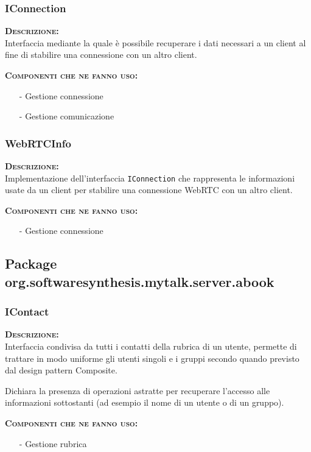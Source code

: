 \subsubsection{IConnection}
\begin{description}
	\item{\scshape\bfseries Descrizione:}\\
Interfaccia mediante la quale è possibile recuperare  i dati necessari a un client al fine di stabilire una connessione con un altro client.
	\item{\scshape\bfseries Componenti che ne fanno uso:}
		\begin{itemize}[noitemsep,nolistsep]
			\item[-] Gestione connessione
			\item[-] Gestione comunicazione
		\end{itemize}
\end{description}

\subsubsection{WebRTCInfo}
\begin{description}
	\item{\scshape\bfseries Descrizione:}\\
Implementazione dell'interfaccia \texttt{IConnection} che rappresenta le informazioni usate da un client per stabilire una connessione WebRTC con un altro client.
	\item{\scshape\bfseries Componenti che ne fanno uso:}
		\begin{itemize}[noitemsep,nolistsep]
			\item[-] Gestione connessione
		\end{itemize}
\end{description}

\subsection{Package org.softwaresynthesis.mytalk.server.abook}

\subsubsection{IContact}
\begin{description}
	\item{\scshape\bfseries Descrizione:}\\
Interfaccia condivisa da tutti i contatti della rubrica di un utente, permette di trattare in modo uniforme gli utenti singoli e i gruppi secondo quando previsto dal design pattern Composite.

Dichiara la presenza di operazioni astratte per recuperare l'accesso alle informazioni sottostanti (ad esempio il nome di un utente o di un gruppo).
	\item{\scshape\bfseries Componenti che ne fanno uso:}
	\begin{itemize}[nolistsep, noitemsep]
	  \item[-] Gestione rubrica
	\end{itemize}
\end{description}

